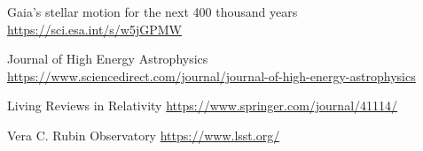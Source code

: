 \begin{wwteorema}{Gaia's stellar motion for the next 400 thousand years}
\href{ https://sci.esa.int/s/w5jGPMW }{ https://sci.esa.int/s/w5jGPMW }
\end{wwteorema}

\begin{wwteorema}{Journal of High Energy Astrophysics}
\href{https://www.sciencedirect.com/journal/journal-of-high-energy-astrophysics}{https://www.sciencedirect.com/journal/journal-of-high-energy-astrophysics}
\end{wwteorema}

\begin{wwteorema}{Living Reviews in Relativity}
\href{https://www.springer.com/journal/41114/}{https://www.springer.com/journal/41114/}
\end{wwteorema}


\begin{wwteorema}{Vera C. Rubin Observatory}
\href{https://www.lsst.org/}{https://www.lsst.org/}
\end{wwteorema}
